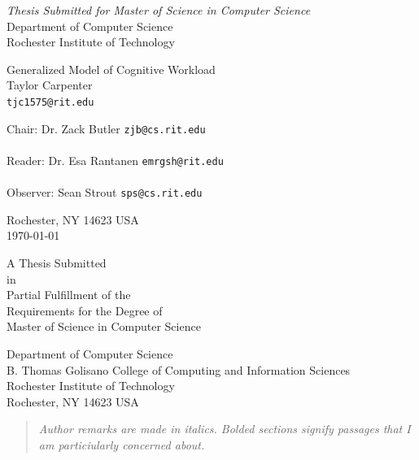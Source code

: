 \documentclass[11pt]{article}
\begin{document}
\thispagestyle{empty}
\begin{center}
\begin{Large}
\emph{Thesis Submitted for Master of Science in Computer Science} \\
Department of Computer Science \\
Rochester Institute of Technology \\
\end{Large}
\vspace{4em}
{\huge Generalized Model of Cognitive Workload} \\
\vspace{3em}
{\LARGE Taylor Carpenter} \\
{\tt tjc1575@rit.edu} \\
\vspace{3em}
\begin{adjustwidth}{.5in}{.5in}
Chair: Dr. Zack Butler \hfill {\tt zjb@cs.rit.edu} \\
\vspace{2em}
\hrulefill \\
\vspace{3em}
Reader: Dr. Esa Rantanen \hfill {\tt emrgsh@rit.edu} \\
\vspace{2em}
\hrulefill \\
\vspace{3em}
Observer: Sean Strout \hfill {\tt sps@cs.rit.edu} \\
\vspace{2em}
\hrulefill
\end{adjustwidth}
\vspace{2em}
Rochester, NY 14623 USA \\
\vspace{2em}
\today
\end{center}
\pagebreak
\thispagestyle{empty}
\begin{center}
\begin{large}
A Thesis Submitted\\
in\\
Partial Fulfillment of the\\
Requirements for the Degree of\\
Master of Science in Computer Science

\vspace{.5in}

Department of Computer Science\\
B. Thomas Golisano College of Computing and Information Sciences\\
Rochester Institute of Technology\\
Rochester, NY 14623 USA
\end{large}
\end{center}
\pagebreak
\thispagestyle{empty}
\begin{abstract}
\emph{Author remarks are made in italics. Bolded sections signify passages that I am particiularly concerned about.}
\end{abstract}
\clearpage
{}
\tableofcontents
\listoffigures
\listoftables
\pagebreak
\end{document}

